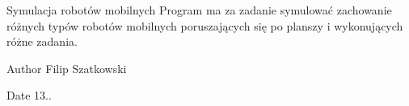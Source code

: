 \begin{DoxyParagraph}{Symulacja robotów mobilnych}
Program ma za zadanie symulować zachowanie różnych typów robotów mobilnych poruszających się po planszy i wykonujących różne zadania. 
\end{DoxyParagraph}
\begin{DoxyAuthor}{Author}
Filip Szatkowski 
\end{DoxyAuthor}
\begin{DoxyDate}{Date}
13.. 
\end{DoxyDate}
